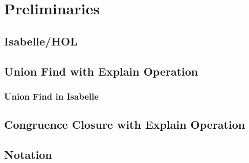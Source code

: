 
\chapter{Preliminaries}\label{chapter:preliminaries}

\section{Isabelle/HOL}

\section{Union Find with Explain Operation}

\subsection{Union Find in Isabelle}

\section{Congruence Closure with Explain Operation}

\section{Notation}


